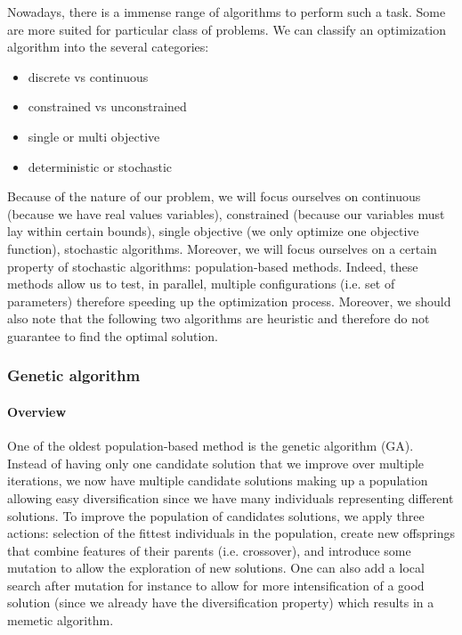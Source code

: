     Nowadays, there is a immense range of algorithms to perform such a task. Some are more suited for particular class of problems. We can classify an optimization algorithm into the several categories:

    \begin{itemize}
        \item discrete vs continuous
        \item constrained vs unconstrained
        \item single or multi objective
        \item deterministic or stochastic
    \end{itemize}
    
    Because of the nature of our problem, we will focus ourselves on continuous (because we have real values variables), constrained (because our variables must lay within certain bounds), single objective (we only optimize one objective function), stochastic algorithms. Moreover, we will focus ourselves on a certain property of stochastic algorithms: population-based methods. Indeed, these methods allow us to test, in parallel, multiple configurations (i.e. set of parameters) therefore speeding up the optimization process. Moreover, we should also note that the following two algorithms are heuristic and therefore do not guarantee to find the optimal solution. 

    \subsubsection{Genetic algorithm}

    \paragraph{Overview}
        One of the oldest population-based method is the genetic algorithm (GA). Instead of having only one candidate solution that we improve over multiple iterations, we now have multiple candidate solutions making up a population allowing easy diversification since we have many individuals representing different solutions. To improve the population of candidates solutions, we apply three actions: selection of the fittest individuals in the population, create new offsprings that combine features of their parents (i.e. crossover), and introduce some mutation to allow the exploration of new solutions. One can also add a local search after mutation for instance to allow for more intensification of a good solution (since we already have the diversification property) which results in a memetic algorithm. \cite{contiGA}

